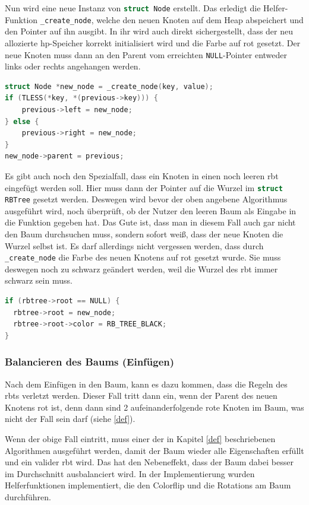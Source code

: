 \documentclass[11pt]{article}
\newcommand{\lstin}[1]{\lstinline[language=C]{#1}}
\begin{document}
Nun wird eine neue Instanz von \lstin{struct Node} erstellt. Das erledigt die Helfer-Funktion \lstin{_create_node}, welche den neuen Knoten auf dem Heap abspeichert und den Pointer auf ihn ausgibt.
In ihr wird auch direkt sichergestellt, dass der neu allozierte \gls{hp}-Speicher korrekt initialisiert wird und die Farbe auf rot gesetzt.
Der neue Knoten muss dann an den Parent vom erreichten \lstin{NULL}-Pointer entweder links oder rechts angehangen werden.

\begin{lstlisting}[language=C]
struct Node *new_node = _create_node(key, value);
if (TLESS(*key, *(previous->key))) {
    previous->left = new_node;
} else {
    previous->right = new_node;
}
new_node->parent = previous;
\end{lstlisting}

Es gibt auch noch den Spezialfall, dass ein Knoten in einen noch leeren \gls{rbt} eingefügt werden soll.
Hier muss dann der Pointer auf die Wurzel im \lstin{struct RBTree} gesetzt werden. Deswegen wird bevor der oben angebene Algorithmus ausgeführt wird, noch überprüft,
ob der Nutzer den leeren Baum als Eingabe in die Funktion gegeben hat.
Das Gute ist, dass man in diesem Fall auch gar nicht den Baum durchsuchen muss, sondern sofort weiß, dass der neue Knoten die Wurzel selbst ist.
Es darf allerdings nicht vergessen werden, dass durch \lstin{_create_node} die Farbe des neuen Knotens auf rot gesetzt wurde. Sie muss deswegen noch zu schwarz geändert werden,
weil die Wurzel des \gls{rbt} immer schwarz sein muss.
\begin{lstlisting}[language=C]
if (rbtree->root == NULL) {
  rbtree->root = new_node;
  rbtree->root->color = RB_TREE_BLACK;
}
\end{lstlisting}

\subsubsection{Balancieren des Baums (Einfügen)}
Nach dem Einfügen in den Baum, kann es dazu kommen, dass die Regeln des \glspl{rbt} verletzt werden.
Dieser Fall tritt dann ein, wenn der Parent des neuen Knotens rot ist, denn dann sind 2 aufeinanderfolgende rote Knoten im Baum, was nicht der Fall sein darf (siehe \ref{def}).

Wenn der obige Fall eintritt, muss einer der in Kapitel \ref{def} beschriebenen Algorithmen ausgeführt werden, damit der Baum wieder alle Eigenschaften erfüllt und ein valider \gls{rbt} wird.
Das hat den Nebeneffekt, dass der Baum dabei besser im Durchschnitt ausbalanciert wird.
In der Implementierung wurden Helferfunktionen implementiert, die den Colorflip und die Rotations am Baum durchführen.
\end{document}
